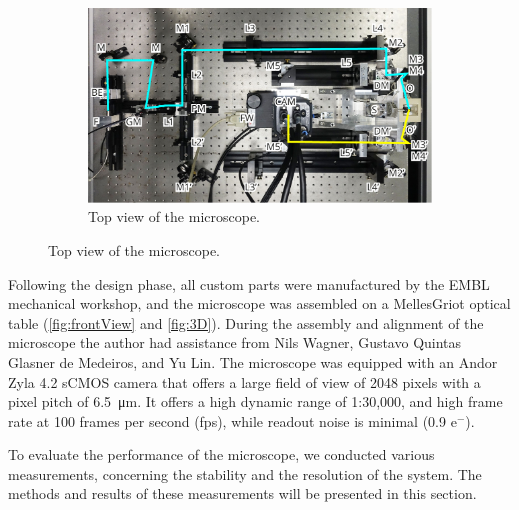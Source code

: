 \begin{figure}
\begin{subfigure}[t]{0.5\textwidth}
    \end{subfigure}
    \\
    \begin{subfigure}[t]{1\textwidth}
      \centering
      \includegraphics[width=\textwidth]{photos/top+light}
      \caption{Top view of the microscope.}
    \end{subfigure}
    \label{fig:frontView}
  \end{figure}


  Following the design phase, all custom parts were manufactured by the EMBL mechanical workshop, and the microscope was assembled on a MellesGriot optical table (\autoref{fig:frontView} and \autoref{fig:3D}). During the assembly and alignment of the microscope the author had assistance from Nils Wagner, Gustavo Quintas Glasner de Medeiros, and Yu Lin. The microscope was equipped with an Andor Zyla 4.2 sCMOS camera that offers a large field of view of 2048 pixels with a pixel pitch of \SI{6.5}{\micro m}. It offers a high dynamic range of 1:30,000, and high frame rate at 100 frames per second (fps), while readout noise is minimal (0.9 e$^-$).
  
  To evaluate the performance of the microscope, we conducted various measurements, concerning the stability and the resolution of the system. The methods and results of these measurements will be presented in this section.

